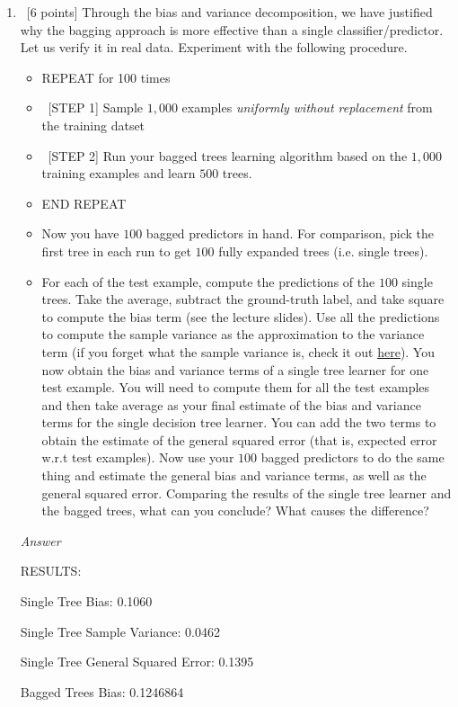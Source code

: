 \documentclass[12pt, fullpage,letterpaper]{article}
\begin{document}
\begin{enumerate}
\begin{enumerate}
	\item~[6 points] Through the bias and variance decomposition, we have justified why the bagging approach is more effective than a single classifier/predictor. Let us verify it in real data. Experiment with the following procedure.
	\begin{itemize}
		\item REPEAT for 100 times
		\item ~[STEP 1] Sample $1,000$ examples \textit{uniformly without replacement} from the training datset
		\item ~[STEP 2] Run your bagged trees learning algorithm based on the $1,000$ training examples and learn $500$ trees.
		\item END REPEAT 
		\item Now you have $100$ bagged predictors in hand. For comparison, pick the first tree in each run to get $100$ fully expanded trees (i.e. single trees). 
		\item 	For each of the test example, compute the predictions of the $100$ single trees. Take the average, subtract the ground-truth label, and take square to compute the bias term (see the lecture slides). Use all the predictions to compute the sample variance  as the approximation to the variance term (if you forget what the sample variance is, check it out 
		\href{http://www.randomservices.org/random/sample/Variance.html}{here}). You now obtain the bias and variance terms of a single tree learner for one test example. You will need to compute them for all the test examples and then take average as your final estimate of the bias and variance terms for the single decision tree learner. You can add the two terms to obtain the estimate of the general squared error (that is, expected error w.r.t test examples). Now use your $100$ bagged predictors to do the same thing and estimate the general bias and variance terms, as well as the general squared error.  Comparing the results of the single tree learner and the bagged trees, what can you conclude?  What causes the difference?  
	\end{itemize}
	
	\emph{Answer}
	
	RESULTS:
	
	Single Tree Bias: 0.1060

    Single Tree Sample Variance: 0.0462
    
    Single Tree General Squared Error: 0.1395
    
    Bagged Trees Bias: 0.1246864
    

\end{enumerate}
\end{enumerate}
\end{document}
